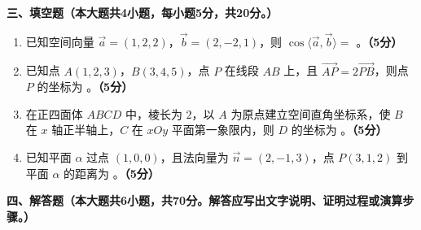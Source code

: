 \documentclass[12pt, a4paper]{ctexart}
\newcommand{\score}[1]{\hfill\textbf{（#1分）}}
\begin{document}
\vspace{1em}

\noindent\textbf{三、填空题（本大题共4小题，每小题5分，共20分。）}

\vspace{0.5em}

\begin{enumerate}[resume]
\item 已知空间向量 $\vec{a}=(1,2,2)$，$\vec{b}=(2,-2,1)$，则 $\cos\langle\vec{a},\vec{b}\rangle=$ \underline{\hspace{3cm}}。\score{5}

\item 已知点 $A(1,2,3)$，$B(3,4,5)$，点 $P$ 在线段 $AB$ 上，且 $\overrightarrow{AP}=2\overrightarrow{PB}$，则点 $P$ 的坐标为 \underline{\hspace{3cm}}。\score{5}

\item 在正四面体 $ABCD$ 中，棱长为 $2$，以 $A$ 为原点建立空间直角坐标系，使 $B$ 在 $x$ 轴正半轴上，$C$ 在 $xOy$ 平面第一象限内，则 $D$ 的坐标为 \underline{\hspace{3cm}}。\score{5}

\item 已知平面 $\alpha$ 过点 $(1,0,0)$，且法向量为 $\vec{n}=(2,-1,3)$，点 $P(3,1,2)$ 到平面 $\alpha$ 的距离为 \underline{\hspace{3cm}}。\score{5}
\end{enumerate}

\vspace{1em}

\noindent\textbf{四、解答题（本大题共6小题，共70分。解答应写出文字说明、证明过程或演算步骤。）}

\vspace{0.5em}
\end{document}

